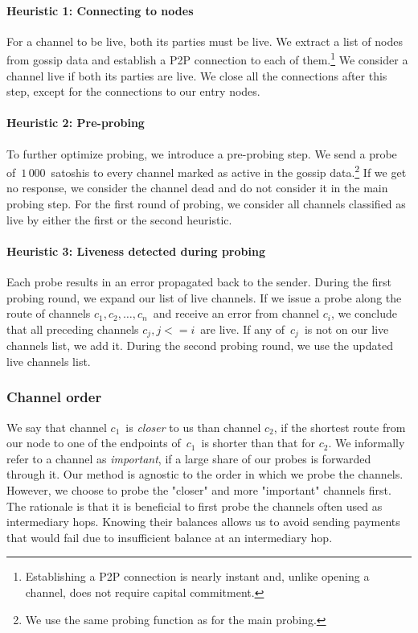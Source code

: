 \paragraph{Heuristic 1: Connecting to nodes}
For a channel to be live, both its parties must be live.
We extract a list of nodes from gossip data and establish a P2P connection to each of them.\footnote{Establishing a P2P connection is nearly instant and, unlike opening a channel, does not require capital commitment.}
We consider a channel live if both its parties are live.
We close all the connections after this step, except for the connections to our entry nodes.

\paragraph{Heuristic 2: Pre-probing}
To further optimize probing, we introduce a pre-probing step.
We send a probe of~$1\,000$~satoshis to every channel marked as active in the gossip data.\footnote{We use the same probing function as for the main probing.}
If we get no response, we consider the channel dead and do not consider it in the main probing step.
For the first round of probing, we consider all channels classified as live by either the first or the second heuristic.

\paragraph{Heuristic 3: Liveness detected during probing}
Each probe results in an error propagated back to the sender.
During the first probing round, we expand our list of live channels.
If we issue a probe along the route of channels $c_1, c_2, \dots, c_n$~and receive an error from channel $c_i$, we conclude that all preceding channels $c_j, j<=i$~are live.
If any of~$c_j$~is not on our live channels list, we add it.
During the second probing round, we use the updated live channels list.


\subsubsection*{Channel order}
We say that channel $c_1$~is \textit{closer} to us than channel $c_2$, if the shortest route from our node to one of the endpoints of~$c_1$~is shorter than that for $c_2$.
We informally refer to a channel as \textit{important}, if a large share of our probes is forwarded through it.
Our method is agnostic to the order in which we probe the channels.
However, we choose to probe the "closer" and more "important" channels first.
The rationale is that it is beneficial to first probe the channels often used as intermediary hops.
Knowing their balances allows us to avoid sending payments that would fail due to insufficient balance at an intermediary hop.

